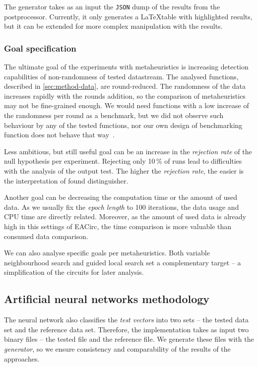\documentclass[
    digital,    %
    oneside,    %
    color,
    11pt,
    nocover,
    notable,
    nolof,
    nolot,
]{fithesis3}
\begin{document}
The generator takes as an input the \texttt{JSON} dump of the results from the postprocessor. Currently, it only generates a \LaTeX table with highlighted results, but it can be extended for more complex manipulation with the results.

\subsubsection{\textbf{Goal specification}}
\label{subsubsec:method-spec-ss-goal}

The ultimate goal of the experiments with metaheuristics is increasing detection capabilities of non-randomness of tested datastream. The analysed functions, described in \cref{sec:method-data}, are round-reduced. The randomness of the data increases rapidly with the rounds addition, so the comparison of metaheuristics may not be fine-grained enough. We would need functions with a low increase of the randomness per round as a benchmark, but we did not observe such behaviour by any of the tested functions, nor our own design of benchmarking function does not behave that way~\cite{EACirc-lut}.

Less ambitious, but still useful goal can be an increase in the \textit{rejection rate} of the null hypothesis per experiment. Rejecting only 10\,\% of runs lead to difficulties with the analysis of the output test. The higher the \textit{rejection rate}, the easier is the interpretation of found distinguisher.

Another goal can be decreasing the computation time or the amount of used data. As we usually fix the \textit{epoch length} to 100 iterations, the data usage and CPU time are directly related. Moreover, as the amount of used data is already high in this settings of EACirc, the time comparison is more valuable than consumed data comparison.

We can also analyse specific goals per metaheuristics. Both variable neighbourhood search and guided local search set a complementary target -- a simplification of the circuits for later analysis.

\subsection{Artificial neural networks methodology}
\label{subsubsec:method-spec-ms-aco}

The neural network also classifies the \textit{test vectors} into two sets -- the tested data set and the reference data set. Therefore, the implementation takes as input two binary files -- the tested file and the reference file. We generate these files with the \textit{generator}, so we ensure consistency and comparability of the results of the approaches.
\end{document}
